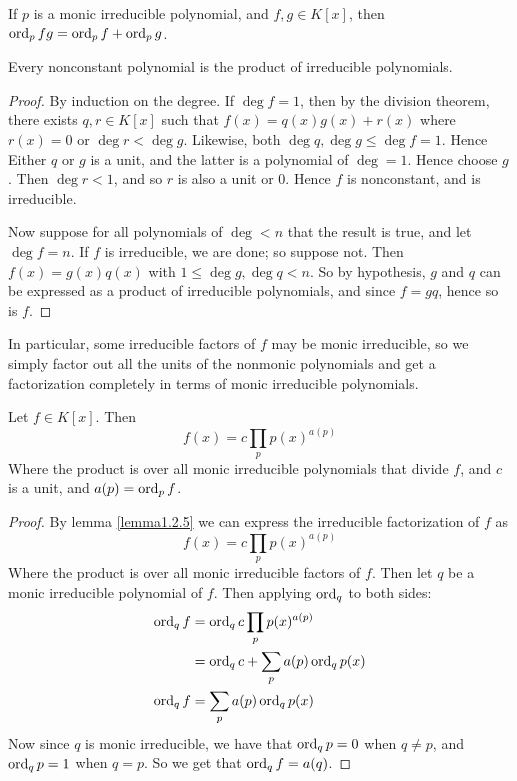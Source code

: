 \begin{corollary}
    If $p$ is a monic irreducible polynomial, and $f,g \in K[x]$, then $\operatorname{ord}_p{fg}=\operatorname{ord}_p{f}+\operatorname{ord}_p{g}$. 
\end{corollary}

\begin{lemma}\label{lemma1.2.5}
    Every nonconstant polynomial is the product of irreducible polynomials.
\end{lemma}
\begin{proof}
    By induction on the degree. If $\deg{f}=1$, then by the division theorem, there exists $q,r \in K[x]$ such that $f(x)=q(x)g(x)+r(x)$ where $r(x)=0$ or $\deg{r}<\deg{g}$. Likewise, both $\deg{q},\deg{g} \leq \deg{f}=1$. Hence Either $q$ or $g$ is a unit, and the latter is a polynomial of $\deg=1$. Hence choose $g$. Then $\deg{r}<1$, and so $r$ is also a unit or 0. Hence $f$ is nonconstant, and is irreducible.
    
    Now suppose for all polynomials of $\deg<n$ that the result is true, and let $\deg{f}=n$. If $f$ is irreducible, we are done; so suppose not. Then $f(x)=g(x)q(x)$ with $1 \leq \deg{g},\deg{q}<n$. So by hypothesis, $g$ and $q$ can be expressed as a product of irreducible polynomials, and since $f=gq$, hence so is $f$.
\end{proof}

In particular, some irreducible factors of $f$ may be monic irreducible, so we simply factor out all the units of the nonmonic polynomials and get a factorization completely in terms of monic irreducible polynomials.

\begin{theorem}\label{theorem1.2.6}
    Let $f \in K[x]$. Then
        \begin{equation}
            f(x)=c \prod_{p} p(x)^{a(p)}
        \end{equation}
    Where the product is over all monic irreducible polynomials that divide $f$, and $c$ is a unit, and $a(p)=\operatorname{ord}_p{f}$. 
\end{theorem}
\begin{proof}
    By lemma \ref{lemma1.2.5} we can express the irreducible factorization of $f$ as 
        \begin{equation*}
            f(x)=c \prod_{p} p(x)^{a(p)}
        \end{equation*}
    Where the product is over all monic irreducible factors of $f$. Then let $q$ be a monic irreducible polynomial of $f$. Then applying $\operatorname{ord}_q$ to both sides:
        \begin{align*}
            \operatorname{ord}_q{f} &= \operatorname{ord}_q{c \prod_{p} p(x)^{a(p)}} \\
                      &= \operatorname{ord}_q{c}+\sum_{p} a(p)\operatorname{ord}_q{p(x)} \\
            \operatorname{ord}_q{f} &= \sum_{p} a(p)\operatorname{ord}_q{p(x)} \\
        \end{align*}
    Now since $q$ is monic irreducible, we have that $\operatorname{ord}_q{p}=0$ when $q \neq p$, and $\operatorname{ord}_q{p}=1$ when $q=p$. So we get that $\operatorname{ord}_q{f}=a(q)$. 
\end{proof}
